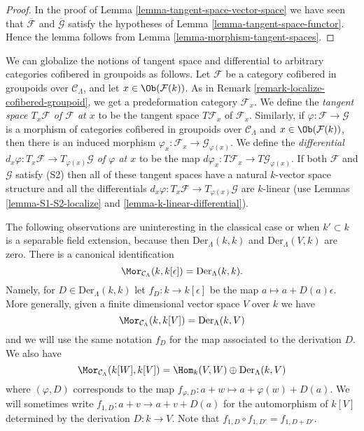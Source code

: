 \begin{proof}
In the proof of
Lemma \ref{lemma-tangent-space-vector-space}
we have seen that $\overline{\mathcal{F}}$ and $\overline{\mathcal{G}}$
satisfy the hypotheses of
Lemma \ref{lemma-tangent-space-functor}.
Hence the lemma follows from
Lemma \ref{lemma-morphism-tangent-spaces}.
\end{proof}

\begin{remark}
\label{remark-tangent-space-cofibered-groupoid}
We can globalize the notions of tangent space and differential to arbitrary
categories cofibered in groupoids as follows. Let $\mathcal{F}$ be a category
cofibered in groupoids over $\mathcal{C}_\Lambda$, and let
$x \in \Ob(\mathcal{F}(k))$. As in
Remark \ref{remark-localize-cofibered-groupoid},
we get a predeformation category $\mathcal{F}_x$. We define the
{\it tangent space $T_x \mathcal{F}$ of $\mathcal{F}$ at $x$}
to be the tangent space $T \mathcal{F}_x$ of
$\mathcal{F}_x$. Similarly, if
$\varphi: \mathcal{F} \to \mathcal{G}$ is a morphism of categories cofibered
in groupoids over $\mathcal{C}_\Lambda$ and $x \in \Ob(\mathcal{F}(k))$,
then there is an induced morphism
$\varphi_x: \mathcal{F}_x \to \mathcal{G}_{\varphi(x)}$. We define the
{\it differential
$d_x \varphi: T_x \mathcal{F} \to T_{\varphi(x)} \mathcal{G}$
of $\varphi$ at $x$} to be the map
$d \varphi_x: T \mathcal{F}_x \to T \mathcal{G}_{\varphi(x)}$.
If both $\mathcal{F}$ and $\mathcal{G}$ satisfy (S2) then
all of these tangent spaces have a natural $k$-vector space structure
and all the differentials
$d_x \varphi: T_x \mathcal{F} \to T_{\varphi(x)} \mathcal{G}$
are $k$-linear (use
Lemmas \ref{lemma-S1-S2-localize} and \ref{lemma-k-linear-differential}).
\end{remark}

\noindent
The following observations are uninteresting in the classical case or when
$k' \subset k$ is a separable field extension, because then
$\text{Der}_\Lambda(k, k)$ and $\text{Der}_\Lambda(V, k)$ are zero.
There is a canonical identification
$$
\Mor_{\mathcal{C}_\Lambda}(k, k[\epsilon]) =
\text{Der}_\Lambda(k, k).
$$
Namely, for $D \in \text{Der}_\Lambda(k, k)$ let $f_D : k \to k[\epsilon]$
be the map $a \mapsto a + D(a)\epsilon$. More generally, given a finite
dimensional vector space $V$ over $k$ we have
$$
\Mor_{\mathcal{C}_\Lambda}(k, k[V]) =
\text{Der}_\Lambda(k, V)
$$
and we will use the same notation $f_D$ for the map associated to the
derivation $D$. We also have
$$
\Mor_{\mathcal{C}_\Lambda}(k[W], k[V]) =
\Hom_k(V, W) \oplus \text{Der}_\Lambda(k, V)
$$
where $(\varphi, D)$ corresponds to the map
$f_{\varphi, D} : a + w \mapsto a + \varphi(w) + D(a)$. We will sometimes write
$f_{1, D} : a + v \to a + v + D(a)$ for the automorphism
of $k[V]$ determined by the derivation $D : k \to V$. Note that
$f_{1, D} \circ f_{1, D'} = f_{1, D + D'}$.

